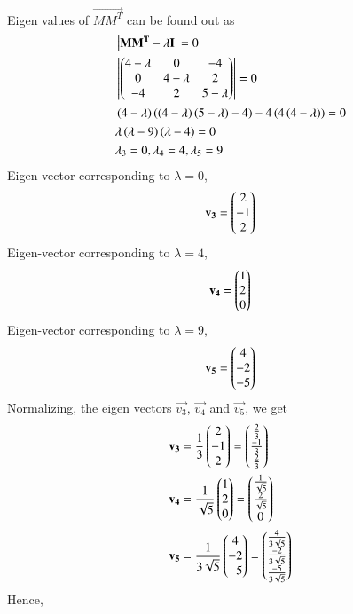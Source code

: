 \documentclass[journal,12pt,twocolumn]{IEEEtran}
\begin{document}
Eigen values of $\vec{MM^T}$ can be found out as
\begin{align}
	& \left\vert\mathbf{MM^T-\lambda I}\right\vert = 0 \\
	& \left\vert\begin{pmatrix}4-\lambda & 0 & -4 \\ 0 & 4-\lambda & 2 \\ -4 & 2 & 5-\lambda\end{pmatrix}\right\vert = 0 \\
	& \left(4-\lambda\right)\left(\left(4-\lambda\right)\left(5-\lambda\right)-4\right)
	-4\left(4\left(4-\lambda\right)\right)  = 0 \\
	& \lambda\left(\lambda-9\right)\left(\lambda-4\right) = 0 \\
	& \lambda_3 = 0, \lambda_4 = 4, \lambda_5=9 
\end{align}
Eigen-vector corresponding to $\lambda=0$,
\begin{align}
	\mathbf{v_3} = \begin{pmatrix}2 \\ -1 \\ 2\end{pmatrix}
\end{align}
Eigen-vector corresponding to $\lambda=4$,
\begin{align}
	\mathbf{v_4} = \begin{pmatrix}1 \\ 2 \\ 0\end{pmatrix}
\end{align}
Eigen-vector corresponding to $\lambda=9$,
\begin{align}
	\mathbf{v_5} = \begin{pmatrix}4 \\ -2 \\ -5\end{pmatrix}
\end{align}
Normalizing, the eigen vectors $\vec{v_3}$, $\vec{v_4}$ and $\vec{v_5}$, we get
\begin{align}
	& \mathbf{v_3} = \frac{1}{3}\begin{pmatrix}2 \\ -1 \\ 2\end{pmatrix} = \begin{pmatrix}\frac{2}{3} \\ \frac{-1}{3} \\ \frac{2}{3}\end{pmatrix} \\
	& \mathbf{v_4} = \frac{1}{\sqrt{5}}\begin{pmatrix}1 \\ 2 \\ 0\end{pmatrix} = \begin{pmatrix}\frac{1}{\sqrt{5}} \\ \frac{2}{\sqrt{5}} \\ 0\end{pmatrix} \\ 
	& \mathbf{v_5} = \frac{1}{3\sqrt{5}}\begin{pmatrix}4 \\ -2 \\ -5\end{pmatrix} =  \begin{pmatrix}\frac{4}{3\sqrt{5}} \\ \frac{-2}{3\sqrt{5}} \\ \frac{-5}{3\sqrt{5}}\end{pmatrix}
\end{align}
Hence,
\end{document}
